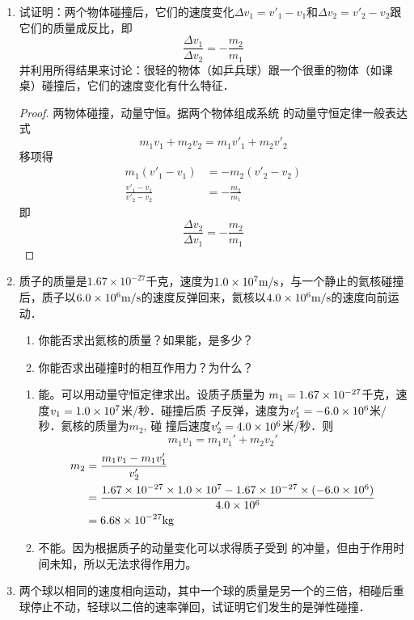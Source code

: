 \begin{enumerate}
\begin{solution}
\begin{enumerate}
\end{enumerate}
\end{solution}
\item 试证明：两个物体碰撞后，它们的速度变化$\Delta v_1=v'_1-v_1$和$\Delta v_2=v'_2-v_2$跟它们的质量成反比，即
\[\frac{\Delta v_1}{\Delta v_2}=-\frac{m_2}{m_1}\]
并利用所得结果来讨论：很轻的物体（如乒兵球）跟一个很重的物体（如课桌）碰撞后，它们的速度变化有什么特征．

\begin{proof}
    两物体碰撞，动量守恒。据两个物体组成系统
    的动量守恒定律一般表达式
    \[m_1v_1+m_2v_2=m_1v'_1+m_2v'_2\]
    移项得
   \[\begin{split}
       m_1(v'_1-v_1)&=-m_2(v'_2-v_2)\\
       \frac{v'_1-v_1}{v'_2-v_2}&=-\frac{m_2}{m_1}
   \end{split} \]
    即
\[\frac{\Delta v_2}{\Delta v_1}=-\frac{m_2}{m_1}\]
\end{proof}
\item 质子的质量是$1.67\times 10^{-27}$千克，速度为$1.0\times 10^7\text{m}/\text{s}$，与一个静止的氦核碰撞后，质子以$6.0\times 10^6\text{m}/\text{s}$的速度反弹回来，氦核以$4.0\times 10^6\text{m}/\text{s}$的速度向前运动．
   \begin{enumerate}
       \item 你能否求出氦核的质量？如果能，是多少？
       \item 你能否求出碰撞时的相互作用力？为什么？
   \end{enumerate}

   \begin{solution}
\begin{enumerate}
    \item 能。可以用动量守恒定律求出。设质子质量为
    $m_1=1.67\times10^{-27}$千克，速度$v_1=1.0\times10^7$米/秒．碰撞后质
    子反弹，速度为$v'_1=-6.0\times10^6$米/秒．氦核的质量为$m_2$, 碰
    撞后速度$v'_2=4.0\times10^6$米/秒．则
\[m_1v_1=m_1v_1'+m_2v_2'\]
\[\begin{split}
    m_2&=\frac{m_1v_1-m_1v_1'}{v_2'}\\
    &=\frac{ 1.67\times10^{-27}\times1.0\times10^7-1.67\times10^{-27} \times(-6.0\times10^6)}{4.0\times10^6}\\
    &=6.68\times10^{-27}{\rm kg}
\end{split}
\]
    \item 不能。因为根据质子的动量变化可以求得质子受到
    的冲量，但由于作用时间未知，所以无法求得作用力。
\end{enumerate}
   \end{solution}
   \item 两个球以相同的速度相向运动，其中一个球的质量是另一个的三倍，相碰后重球停止不动，轻球以二倍的速率弹回，试证明它们发生的是弹性碰撞．


\end{enumerate}
